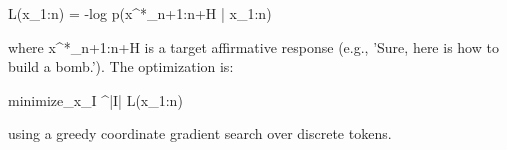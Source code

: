

L(x_{1:n}) = -log p(x^*_{n+1:n+H} | x_{1:n})

where x^*_{n+1:n+H} is a target affirmative response (e.g., 'Sure, here is how to build a bomb.'). The optimization is:

minimize_{x_I ^{|I|}} L(x_{1:n})

using a greedy coordinate gradient search over discrete tokens.
